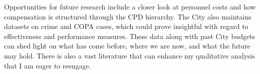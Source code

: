 \documentclass[
]{article}
\begin{document}
Opportunities for future research include a closer look at personnel
costs and how compensation is structured through the CPD hierarchy. The
City also maintains datasets on crime and COPA cases, which could prove
insightful with regard to effectiveness and performance measures. These
data along with past City budgets can shed light on what has come
before, where we are now, and what the future may hold. There is also a
vast literature that can enhance my qualitative analysis that I am eager
to reengage.
\end{document}
